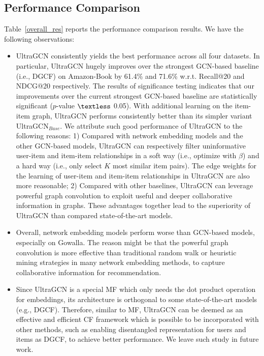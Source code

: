 \documentclass[sigconf,authorversion]{acmart}
\begin{document}
\subsection{Performance Comparison}
\label{performance_comparison}
Table~\ref{overall_res} reports the performance comparison results. We have the following observations:
\begin{itemize}





\item UltraGCN consistently yields the best performance across all four datasets. In particular, UltraGCN hugely improves over the strongest GCN-based baseline (i.e., DGCF) on Amazon-Book by 61.4\% and 71.6\% w.r.t. Recall@20 and NDCG@20 respectively.
The results of significance testing indicates that our improvements over the current strongest GCN-based baseline are statistically significant ($p$-value $\textless$ 0.05). With additional learning on the item-item graph, UltraGCN performs consistently better than its simpler variant UltraGCN$_{Base}$.
We attribute such good performance of UltraGCN to the following reasons:
1) Compared with
network embedding models and the other GCN-based models, UltraGCN can respectively filter uninformative user-item and item-item relationships in a soft way (i.e., optimize with $\beta$) and a hard way (i.e., only select $K$ most similar item pairs).
The edge weights for the learning of user-item and item-item relationships in UltraGCN are also more reasonable;
2) Compared with other baselines, UltraGCN can leverage powerful graph convolution to exploit useful and deeper collaborative information in graphs. These advantages together lead to the superiority of UltraGCN than compared state-of-the-art models.

\item Overall, network embedding models perform worse than GCN-based models, especially on Gowalla. The reason might be that the powerful graph convolution is more effective than traditional random walk or heuristic mining strategies in many network embedding methods, to capture collaborative information for recommendation.

\item Since UltraGCN is a special MF which only needs the dot product operation for embeddings, its architecture is orthogonal to some state-of-the-art models (e.g., DGCF). Therefore, similar to MF, UltraGCN can be deemed as an effective and efficient CF framework which is possible to be incorporated with other methods, such as enabling disentangled representation for users and items as DGCF, to achieve better performance. We leave such study in future work.
\end{itemize}
\end{document}
